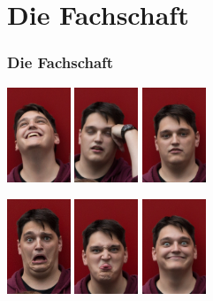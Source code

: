 \documentclass{beamer}
\begin{document}
\section{Die Fachschaft}
\begin{frame}
\frametitle{Die Fachschaft}

\begin{center}
\pause

\includegraphics[width=1.9cm]{img/benni1.jpg}
\pause
\hspace{0.1cm}
\includegraphics[width=1.9cm]{img/benni2.jpg}
\pause
\hspace{0.1cm}
\includegraphics[width=1.9cm]{img/benni3.jpg}\\
\pause

\vspace{0.2cm}

\includegraphics[width=1.9cm]{img/benni4.jpg}
\pause
\hspace{0.1cm}
\includegraphics[width=1.9cm]{img/benni5.jpg}
\pause
\hspace{0.1cm}
\includegraphics[width=1.9cm]{img/benni6.jpg}


\end{center}
\end{frame}
\end{document}
